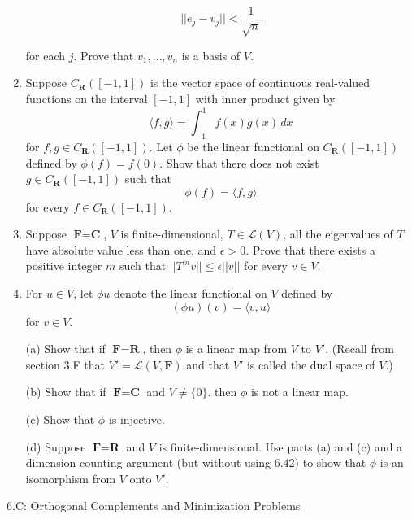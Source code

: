 \documentclass{book}
\begin{document}
\begin{enumerate}
\begin{equation*}
    ||e_j-v_j|| < \frac{1}{\sqrt{n}}
\end{equation*}

for each \(j\).  Prove that \(v_1,\dots,v_n\) is a basis of \(V\).



\item Suppose \(C_{\textbf{R}}([-1,1])\) is the vector space of continuous real-valued functions on the interval \([-1,1]\) with inner product given by \[\langle f,g \rangle = \int_{-1}^{1} f(x)g(x) \, dx\] for \(f,g \in C_{\textbf{R}}([-1,1])\).  Let \(\phi\) be the linear functional on \(C_{\textbf{R}}([-1,1])\) defined by \(\phi(f)=f(0)\).  Show that there does not exist \(g \in C_{\textbf{R}}([-1,1])\) such that \[\phi(f)=\langle f,g \rangle\] for every \(f \in C_{\textbf{R}}([-1,1])\).

\item Suppose \(\textbf{F}=\textbf{C}\), \(V\) is finite-dimensional, \(T \in \mathcal{L}(V)\), all the eigenvalues of \(T\) have absolute value less than one, and \(\epsilon > 0\).  Prove that there exists a positive integer \(m\) such that \(||T^mv|| \leq \epsilon||v||\) for every \(v \in V\).

\item For \(u \in V\), let \(\phi u\) denote the linear functional on \(V\) defined by \[(\phi u)(v)=\langle v,u \rangle\] for \(v \in V\).

(a) Show that if \(\textbf{F}=\textbf{R}\), then \(\phi\) is a linear map from \(V\) to \(V'\).  (Recall from section 3.F that \(V'=\mathcal{L}(V,\textbf{F})\) and that \(V'\) is called the dual space of \(V\).)

(b) Show that if \(\textbf{F}=\textbf{C}\) and \(V \neq \{0\}\). then \(\phi\) is not a linear map.

(c) Show that \(\phi\) is injective.

(d) Suppose \(\textbf{F}=\textbf{R}\) and \(V\) is finite-dimensional.  Use parts (a) and (c) and a dimension-counting argument (but without using 6.42) to show that \(\phi\) is an isomorphism from \(V\) onto \(V'\).

\end{enumerate}

6.C: Orthogonal Complements and Minimization Problems
\end{document}
